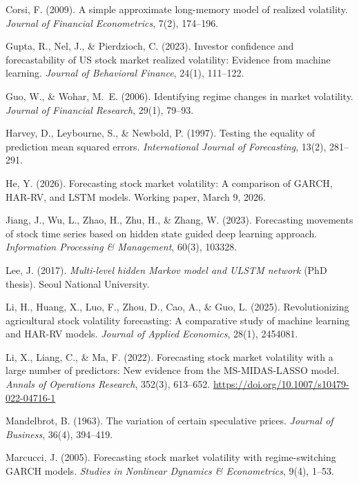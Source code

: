 \documentclass{article}
\begin{document}
\begin{description}[leftmargin=1.5em,labelindent=0pt,style=unboxed,itemsep=0.2em,topsep=0.2em]
\item Corsi, F. (2009). A simple approximate long-memory model of realized volatility. \emph{Journal of Financial Econometrics}, 7(2), 174--196.

\item Gupta, R., Nel, J., \& Pierdzioch, C. (2023). Investor confidence and forecastability of US stock market realized volatility: Evidence from machine learning. \emph{Journal of Behavioral Finance}, 24(1), 111--122.

\item Guo, W., \& Wohar, M.~E. (2006). Identifying regime changes in market volatility. \emph{Journal of Financial Research}, 29(1), 79--93.

\item Harvey, D., Leybourne, S., \& Newbold, P. (1997). Testing the equality of prediction mean squared errors. \emph{International Journal of Forecasting}, 13(2), 281--291.

\item He, Y. (2026). Forecasting stock market volatility: A comparison of GARCH, HAR-RV, and LSTM models. Working paper, March 9, 2026.

\item Jiang, J., Wu, L., Zhao, H., Zhu, H., \& Zhang, W. (2023). Forecasting movements of stock time series based on hidden state guided deep learning approach. \emph{Information Processing \& Management}, 60(3), 103328.

\item Lee, J. (2017). \emph{Multi-level hidden Markov model and ULSTM network} (PhD thesis). Seoul National University.

\item Li, H., Huang, X., Luo, F., Zhou, D., Cao, A., \& Guo, L. (2025). Revolutionizing agricultural stock volatility forecasting: A comparative study of machine learning and HAR-RV models. \emph{Journal of Applied Economics}, 28(1), 2454081.

\item Li, X., Liang, C., \& Ma, F. (2022). Forecasting stock market volatility with a large number of predictors: New evidence from the MS-MIDAS-LASSO model. \emph{Annals of Operations Research}, 352(3), 613--652. \url{https://doi.org/10.1007/s10479-022-04716-1}

\item Mandelbrot, B. (1963). The variation of certain speculative prices. \emph{Journal of Business}, 36(4), 394--419.

\item Marcucci, J. (2005). Forecasting stock market volatility with regime-switching GARCH models. \emph{Studies in Nonlinear Dynamics \& Econometrics}, 9(4), 1--53.


\end{description}
\end{document}

